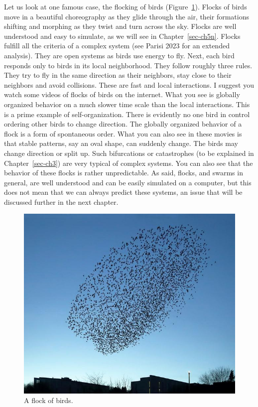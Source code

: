 \documentclass[
  a4paper,
  DIV=11,
  numbers=noendperiod,
  oneside]{scrreprt}
\begin{document}
Let us look at one famous case, the flocking of birds
(Figure~\ref{fig-ch1-img1}). Flocks of birds move in a beautiful
choreography as they glide through the air, their formations shifting
and morphing as they twist and turn across the sky. Flocks are well
understood and easy to simulate, as we will see in
Chapter~\ref{sec-ch5n}. Flocks fulfill all the criteria of a complex
system (see Parisi 2023 for an extended analysis). They are open systems
as birds use energy to fly. Next, each bird responds only to birds in
its local neighborhood. They follow roughly three rules. They try to fly
in the same direction as their neighbors, stay close to their neighbors
and avoid collisions. These are fast and local interactions. I suggest
you watch some videos of flocks of birds on the internet. What you see
is globally organized behavior on a much slower time scale than the
local interactions. This is a prime example of self-organization. There
is evidently no one bird in control ordering other birds to change
direction. The globally organized behavior of a flock is a form of
spontaneous order. What you can also see in these movies is that stable
patterns, say an oval shape, can suddenly change. The birds may change
direction or split up. Such bifurcations or catastrophes (to be
explained in Chapter~\ref{sec-ch3}) are very typical of complex systems.
You can also see that the behavior of these flocks is rather
unpredictable. As said, flocks, and swarms in general, are well
understood and can be easily simulated on a computer, but this does not
mean that we can always predict these systems, an issue that will be
discussed further in the next chapter.

\begin{figure}

{\centering \includegraphics{media/ch1/image1.jpg}

}

\caption{\label{fig-ch1-img1}A flock of birds.}

\end{figure}
\end{document}
